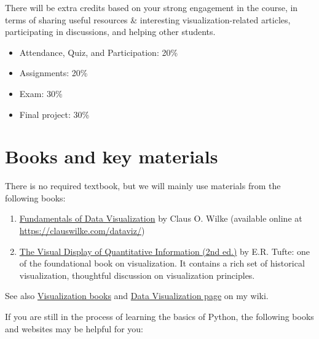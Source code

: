 \documentclass[11pt,article,oneside]{memoir} %
\begin{document}
There will be extra credits based on your strong engagement in the course, in terms of sharing useful resources \& interesting visualization-related articles, participating in discussions, and helping other students.

\begin{itemize}%

\item Attendance, Quiz, and Participation: 20\%

\item Assignments: 20\% 

\item Exam: 30\%

\item Final project: 30\%

\end{itemize}%
\section{Books and key materials}%

There is no required textbook, but we will mainly use materials from the following books:

\begin{enumerate}
    
    \item \href{https://clauswilke.com/dataviz/}{Fundamentals of Data Visualization} by Claus O. Wilke (available online at \url{https://clauswilke.com/dataviz/})

\item \href{http://www.amazon.com/gp/product/0961392142}{The Visual Display of Quantitative Information (2nd ed.)} by E.R. Tufte: one of the foundational book on visualization. It contains a rich set of historical visualization, thoughtful discussion on visualization principles. 

\end{enumerate}

See also \href{https://yyiki.org/wiki/Data%20visualization/Books/}{Visualization books} and \href{https://yyiki.org/wiki/Data%20visualization/}{Data Visualization page} on my wiki. 


If you are still in the process of learning the basics of Python, the following books and websites may be helpful for you:
\end{document}
